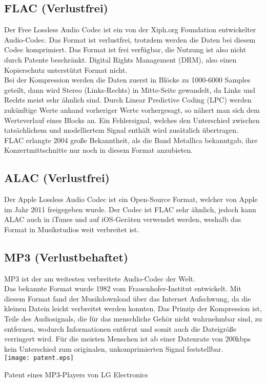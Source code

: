 \documentclass{extarticle}
\begin{document}
		\subsection{FLAC (Verlustfrei)}
		Der Free Lossless Audio Codec ist ein von der Xiph.org Foundation entwickelter Audio-Codec. Das Format ist verlustfrei, trotzdem werden die Daten bei diesem Codec komprimiert. Das Format ist frei verfügbar, die Nutzung ist also nicht durch Patente beschränkt. Digital Rights Management (DRM), also einen Kopierschutz unterstützt Format nicht. \cite{FLAC} \\
		Bei der Kompression werden die Daten zuerst in Blöcke zu 1000-6000 Samples geteilt, dann wird Stereo (Links-Rechts) in Mitte-Seite gewandelt, da Links und Rechts meist sehr ähnlich sind. Durch Linear Predictive Coding (LPC) werden zukünftige Werte anhand vorheriger Werte vorhergesagt, so nähert man sich dem Werteverlauf eines Blocks an. Ein Fehlersignal, welches den Unterschied zwischen tatsächlichem und modelliertem Signal enthält wird zusätzlich übertragen. \\
		FLAC erlangte 2004 große Bekanntheit, als die Band Metallica bekanntgab, ihre Konzertmittschnitte nur noch in diesem Format anzubieten. \cite{FLACWiki}
		
		\subsection{ALAC (Verlustfrei)}
		Der Apple Lossless Audio Codec ist ein Open-Source Format, welcher von Apple im Jahr 2011 freigegeben wurde. Der Codec ist FLAC sehr ähnlich, jedoch kann ALAC auch in iTunes und auf iOS-Geräten verwendet werden, weshalb das Format in Musikstudios weit verbreitet ist. \cite{ALAC}
		
		\subsection{MP3 (Verlustbehaftet)}
		MP3 ist der am weitesten verbreitete Audio-Codec der Welt. \cite{mp3} \\
		Das bekannte Format wurde 1982 vom Frauenhofer-Institut entwickelt. Mit diesem Format fand der Musikdownload über das Internet Aufschwung, da die kleinen Datein leicht verbreitet werden konnten. Das Prinzip der Kompression ist, Teile des Audiosignals, die für das menschliche Gehör nicht wahrnehmbar sind, zu entfernen, wodurch Informationen entfernt und somit auch die Dateigröße verringert wird. Für die meisten Menschen ist ab einer Datenrate von 200kbps kein Unterschied zum originalen, unkomprimierten Signal feststellbar. \cite{mp3aac} \\
		\texttt{[image: patent.eps]} \\
		\begin{center} Patent eines MP3-Players von LG Electronics \cite{patent} \end{center}
		
\end{document}
